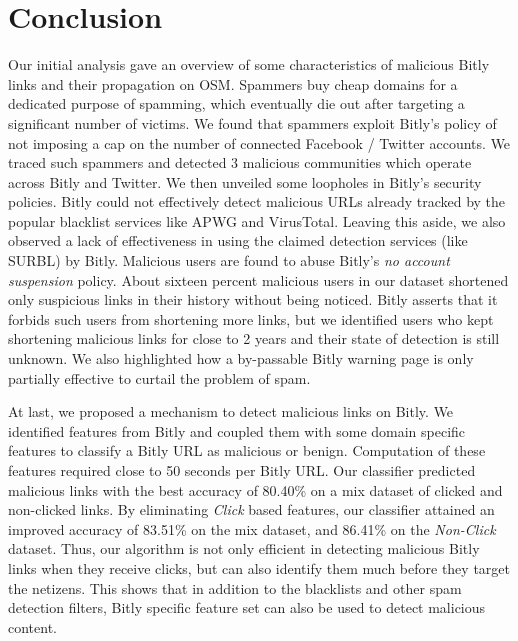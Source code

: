 \documentclass[conference]{IEEEtran}
\begin{document}
\section{Conclusion}\label{Conclusion}
\vspace{4pt}
Our initial analysis gave an overview of some characteristics of malicious Bitly links and their propagation on OSM. Spammers buy cheap domains for a dedicated purpose of spamming, which eventually die out after targeting a significant number of victims. 
We found that spammers exploit Bitly's policy of not imposing a cap on the number of connected Facebook / Twitter accounts. We traced such spammers and detected 3 malicious communities which operate across Bitly and Twitter. 
We then unveiled some loopholes in Bitly's security policies. Bitly could not effectively detect malicious URLs already tracked by the popular blacklist services like APWG and VirusTotal. Leaving this aside, we also observed a lack of effectiveness in using the claimed detection services (like SURBL) by Bitly. Malicious users are found to abuse Bitly's \textit{no account suspension} policy. About sixteen percent malicious users in our dataset shortened only suspicious links in their history without being noticed. Bitly asserts that it forbids such users from shortening more links, but we identified users who kept shortening malicious links for close to 2 years and their state of detection is still unknown. We also highlighted how a by-passable Bitly warning page is only partially effective to curtail the problem of spam.

At last, we proposed a mechanism to detect malicious links on Bitly. We identified features from Bitly and coupled them with some domain specific features to classify a Bitly URL as malicious or benign. Computation of these features required close to 50 seconds per Bitly URL. Our classifier predicted malicious links with the best accuracy of 80.40\% on a mix dataset of clicked and non-clicked links. By eliminating \textit{Click} based features, our classifier attained an improved accuracy of 83.51\% on the mix dataset, and 86.41\% on the \textit{Non-Click} dataset. Thus, our algorithm is not only efficient in detecting malicious Bitly links when they receive clicks, but can also identify them much before they target the netizens. This shows that in addition to the blacklists and other spam detection filters, Bitly specific feature set can also be used to detect malicious content.
\end{document}
